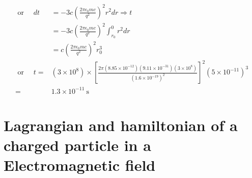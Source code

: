 \begin{answer}
\begin{align*}
\text{ or }\quad
d t &=-3 c\left(\frac{2 \pi \epsilon_{0} m c}{q^{2}}\right)^{2} r^{2} d r \Rightarrow t \\
&=-3 c\left(\frac{2 \pi \epsilon_{0} m c}{q^{2}}\right)^{2} \int_{r_{0}}^{0} r^{2} d r \\
&=c\left(\frac{2 \pi \epsilon_{0} m c}{q^{2}}\right)^{2} r_{0}^{3}\\
\text{ or }\quad
t=&\left(3 \times 10^{8}\right) \times 
\left[\frac{2 \pi\left(8.85 \times 10^{-12}\right)\left(9.11 \times 10^{-31}\right)\left(3 \times 10^{8}\right)}{\left(1.6 \times 10^{-19}\right)^{2}}\right]^{2}\left(5 \times 10^{-11}\right)^{3} \\
=& 1.3 \times 10^{-11} \mathrm{~s}
\end{align*}
\end{answer}

\section{Lagrangian and hamiltonian of a charged particle in a Electromagnetic field}

